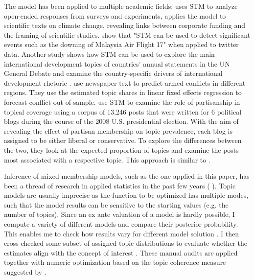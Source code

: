 \documentclass[12pt,a4paper,notitlepage]{article}
\begin{document}
The model has been applied to multiple academic fields: \citet{roberts_structural_2014} uses STM to analyze open-ended responses from surveys and experiments, \citet{farrell_corporate_2016} applies the model to scientific texts on climate change, revealing links between corporate funding and the framing of scientific studies. \citet{mishler_using_2015} show that "STM can be used to detect significant events such as the downing of Malaysia Air Flight 17" when applied to twitter data. Another study shows how STM can be used to explore the main international development topics of countries' annual statements in the UN General Debate and examine the country-specific drivers of international development rhetoric \citep{baturo_what_2017}. \citet{mueller_reading_2016} use newspaper text to predict armed conflicts in different regions. They use the estimated topic shares in linear fixed effects regression to forecast conflict out-of-sample. \citet{roberts_navigating_2016} use STM to examine the role of partisanship in topical coverage using a corpus of 13,246 posts that were written for 6 political blogs during the course of the 2008 U.S. presidential election. With the aim of revealing the effect of partisan membership on topic prevalence, each blog is assigned to be either liberal or conservative. To explore the differences between the two, they look at the expected proportion of topics and examine the posts most associated with a respective topic. This approach is similar to \citet{roberts_model_2016}. 

Inference of mixed-membership models, such as the one applied in this paper, has been a thread of research in applied statistics in the past few years (\citet{blei_latent_2003} \citet{erosheva_mixed-membership_2004} \citet{braun_variational_2010}). Topic models are usually imprecise as the function to be optimized has multiple modes, such that the model results can be sensitive to the starting values (e.g. the number of topics). Since an ex ante valuation of a model is hardly possible, I compute a variety of different models and compare their posterior probability. This enables me to check how results vary for different model solution \citep{roberts_navigating_2016}. I then cross-checked some subset of assigned topic distributions to evaluate whether the estimates align with the concept of interest \citep{gentzkow_text_2017}. These manual audits are applied together with numeric optimization based on the topic coherence measure suggested by \citet{mimno_optimizing_2011}. 
\end{document}
